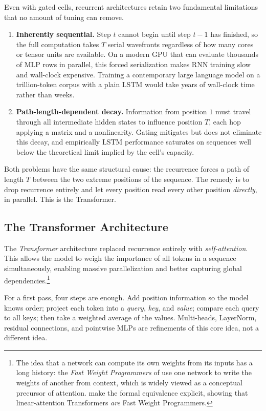 \documentclass[11pt,a4paper]{report}
\begin{document}
Even with gated cells, recurrent architectures retain two fundamental limitations that no amount of tuning can remove.
\begin{enumerate}[itemsep=2pt]
\item \textbf{Inherently sequential.}  Step $t$ cannot begin until step $t-1$ has finished, so the full computation takes $T$ serial wavefronts regardless of how many cores or tensor units are available.  On a modern GPU that can evaluate thousands of MLP rows in parallel, this forced serialization makes RNN training slow and wall-clock expensive.  Training a contemporary large language model on a trillion-token corpus with a plain LSTM would take years of wall-clock time rather than weeks.
\item \textbf{Path-length-dependent decay.}  Information from position $1$ must travel through all intermediate hidden states to influence position $T$, each hop applying a matrix and a nonlinearity.  Gating mitigates but does not eliminate this decay, and empirically LSTM performance saturates on sequences well below the theoretical limit implied by the cell's capacity.
\end{enumerate}
Both problems have the same structural cause: the recurrence forces a path of length $T$ between the two extreme positions of the sequence.  The remedy is to drop recurrence entirely and let every position read every other position \emph{directly}, in parallel.  This is the Transformer.

\subsection{The Transformer Architecture}
\label{sec:transformers}

The \emph{Transformer} architecture \citep{vaswani2017attention} replaced recurrence entirely with \emph{self-attention}.  This allows the model to weigh the importance of all tokens in a sequence simultaneously, enabling massive parallelization and better capturing global dependencies.\footnote{The idea that a network can compute its own weights from its inputs has a long history: the \emph{Fast Weight Programmers} of \citet{schmidhuber1992learning} use one network to write the weights of another from context, which is widely viewed as a conceptual precursor of attention.  \citet{schlag2021linear} make the formal equivalence explicit, showing that linear-attention Transformers \emph{are} Fast Weight Programmers.}

For a first pass, four steps are enough.  Add position information so the model knows order; project each token into a \emph{query}, \emph{key}, and \emph{value}; compare each query to all keys; then take a weighted average of the values.  Multi-heads, LayerNorm, residual connections, and pointwise MLPs are refinements of this core idea, not a different idea.
\end{document}
